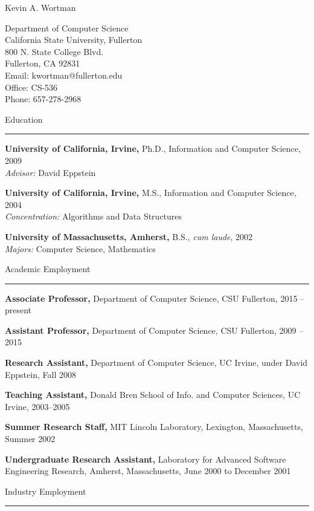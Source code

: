 \documentclass[11pt]{letter}
\begin{document}
\newcommand{\heading}[1]{ \vspace{11pt} {\Large #1} \\ \rule{6.5in}{.5pt} }

{\Large Kevin A. Wortman}
\begin{multicols}{2}
Department of Computer Science\\
California State University, Fullerton\\
800 N. State College Blvd.\\
Fullerton, CA 92831\\

Email: kwortman@fullerton.edu\\
Office: CS-536\\
Phone: 657-278-2968\\
\end{multicols}

\heading{Education}

\textbf{University of California, Irvine,} Ph.D., Information and Computer Science, 2009 \\
\emph{Advisor:} David Eppstein

\textbf{University of California, Irvine,} M.S., Information and Computer Science, 2004 \\
\emph{Concentration:} Algorithms and Data Structures

\textbf{University of Massachusetts, Amherst,} B.S., \emph{cum laude}, 2002\\
\emph{Majors:} Computer Science, Mathematics

\heading{Academic Employment}

\textbf{Associate Professor,} Department of Computer Science, CSU Fullerton, 2015 -- present

\textbf{Assistant Professor,} Department of Computer Science, CSU Fullerton, 2009 -- 2015

\textbf{Research Assistant,} Department of Computer Science, UC Irvine, under David Eppstein, Fall 2008

\textbf{Teaching Assistant,} Donald Bren School of Info. and Computer Sciences, UC Irvine,  2003--2005

\textbf{Summer Research Staff,} MIT Lincoln Laboratory, Lexington, Massachusetts, Summer 2002

\textbf{Undergraduate Research Assistant,} Laboratory for Advanced Software Engineering Research, Amherst, Massachusetts, June 2000 to December 2001

\heading{Industry Employment}
\end{document}
